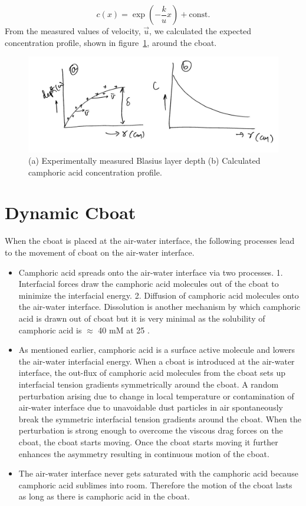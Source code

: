 \documentclass[aps,twocolumn, floatfix, superscriptaddress]{revtex4}
\begin{document}
\begin{equation} \label{eq:approx1d}
c(x) = \exp\left(-\frac{k}{u}x\right) + \mathrm{const.}
\end{equation}
From the measured values of velocity, $\vec{u}$, we calculated the expected concentration profile, shown in figure~\ref{fig:blandca}, around the cboat. 
\begin{figure}[ht]
    \begin{center}
       \includegraphics[scale=0.18]{figure3.jpg}
    \end{center}
    \caption{(a) Experimentally measured Blasius layer depth (b) Calculated camphoric acid concentration profile.}
    \label{fig:blandca}
\end{figure}
\section{Dynamic Cboat}
When the cboat is placed at the air-water interface, the following processes lead to the movement of cboat on the air-water interface.
\begin{itemize}
\item Camphoric acid spreads onto the air-water interface via two processes. 1. Interfacial forces draw the camphoric acid molecules out of the cboat to minimize the interfacial energy. 2. Diffusion of camphoric acid molecules onto the air-water interface. Dissolution is another mechanism by which camphoric acid is drawn out of cboat but it is very minimal as the solubility of camphoric acid is $\approx$ 40 mM at 25 \celsius.
\item As mentioned earlier, camphoric acid is a surface active molecule and lowers the air-water interfacial energy. When a cboat is introduced at the air-water interface, the out-flux of camphoric acid molecules from the cboat sets up interfacial tension gradients symmetrically around the cboat. A random perturbation arising due to change in local temperature or contamination of air-water interface due to unavoidable dust particles in air spontaneously break the symmetric interfacial tension gradients around the cboat. When the perturbation is strong enough to overcome the viscous drag forces on the cboat, the cboat starts moving. Once the cboat starts moving it further enhances the asymmetry resulting in continuous motion of the cboat.
\item The air-water interface never gets saturated with the camphoric acid because camphoric acid sublimes into room. Therefore the motion of the cboat lasts as long as there is camphoric acid in the cboat.
\end{itemize}
\end{document}
